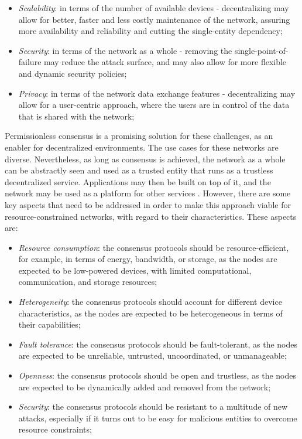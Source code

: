 \documentclass[journal]{IEEEtran}
\begin{document}
\begin{itemize}
  \item \emph{Scalability}:  in terms of the number of available devices - decentralizing may allow
  for better, faster and less costly maintenance of the network, assuring more availability and reliability
  and cutting the single-entity dependency;
  \item \emph{Security}: in terms of the network as a whole - removing the single-point-of-failure 
  may reduce the attack surface, and may also allow for more flexible and dynamic security policies;
  \item \emph{Privacy}: in terms of the network data exchange features - decentralizing may allow for
  a user-centric approach, where the users are in control of the data that is shared with the network; 
\end{itemize}

Permissionless consensus is a promising solution for these challenges, as an enabler for
decentralized environments. The use cases for these networks are diverse. Nevertheless,
as long as consensus is achieved, the network as a whole can be abstractly seen and used
as a trusted entity that runs as a trustless decentralized service. Applications may then
be built on top of it, and the network may be used as a platform for other services \cite{queralta2021blockchain}.
However, there are some key aspects that need to be addressed
in order to make this approach viable for resource-constrained networks, with regard to their characteristics. These aspects are:

\begin{itemize}
  \item \emph{Resource consumption}: the consensus protocols should be resource-efficient, for example, in terms of energy, bandwidth, or storage, 
  as the nodes are expected to be low-powered devices, with limited computational, communication, and storage resources;
  \item \emph{Heterogeneity}: the consensus protocols should account for different device characteristics, 
  as the nodes are expected to be heterogeneous in terms of their capabilities;
  \item \emph{Fault tolerance}: the consensus protocols should be fault-tolerant, as the nodes are expected to be unreliable, 
  untrusted, uncoordinated, or unmanageable;
  \item \emph{Openness}: the consensus protocols should be open and trustless, as the nodes are expected to be 
  dynamically added and removed from the network;
  \item \emph{Security}: the consensus protocols should be resistant to a multitude of new attacks,
   especially if it turns out to be easy for malicious entities to overcome resource constraints;
\end{itemize}
\end{document}
